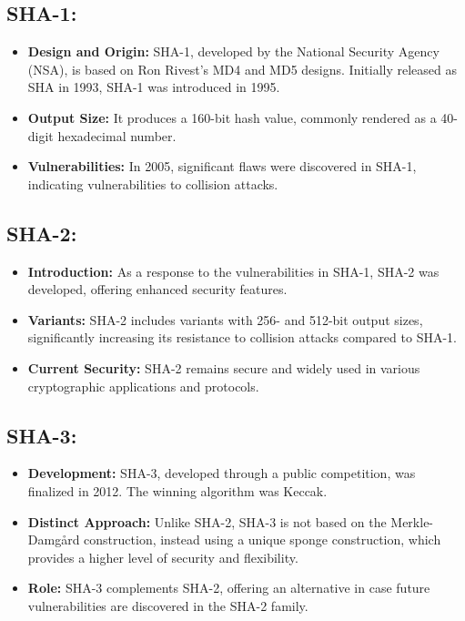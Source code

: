 \documentclass[12pt]{article}
\begin{document}
\subsection*{SHA-1:}
\begin{itemize}
    \item \textbf{Design and Origin:} SHA-1, developed by the National Security Agency (NSA), is based on Ron Rivest's MD4 and MD5 designs. Initially released as SHA in 1993, SHA-1 was introduced in 1995.
    \item \textbf{Output Size:} It produces a 160-bit hash value, commonly rendered as a 40-digit hexadecimal number.
    \item \textbf{Vulnerabilities:} In 2005, significant flaws were discovered in SHA-1, indicating vulnerabilities to collision attacks.
\end{itemize}

\subsection*{SHA-2:}
\begin{itemize}
    \item \textbf{Introduction:} As a response to the vulnerabilities in SHA-1, SHA-2 was developed, offering enhanced security features.
    \item \textbf{Variants:} SHA-2 includes variants with 256- and 512-bit output sizes, significantly increasing its resistance to collision attacks compared to SHA-1.
    \item \textbf{Current Security:} SHA-2 remains secure and widely used in various cryptographic applications and protocols.
\end{itemize}

\subsection*{SHA-3:}
\begin{itemize}
    \item \textbf{Development:} SHA-3, developed through a public competition, was finalized in 2012. The winning algorithm was Keccak.
    \item \textbf{Distinct Approach:} Unlike SHA-2, SHA-3 is not based on the Merkle-Damgård construction, instead using a unique sponge construction, which provides a higher level of security and flexibility.
    \item \textbf{Role:} SHA-3 complements SHA-2, offering an alternative in case future vulnerabilities are discovered in the SHA-2 family.
\end{itemize}
\end{document}
